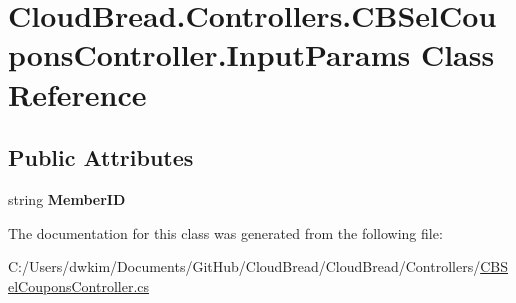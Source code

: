 \hypertarget{class_cloud_bread_1_1_controllers_1_1_c_b_sel_coupons_controller_1_1_input_params}{}\section{Cloud\+Bread.\+Controllers.\+C\+B\+Sel\+Coupons\+Controller.\+Input\+Params Class Reference}
\label{class_cloud_bread_1_1_controllers_1_1_c_b_sel_coupons_controller_1_1_input_params}
\subsection*{Public Attributes}
\begin{DoxyCompactItemize}
\item 
string {\bfseries Member\+ID}\hypertarget{class_cloud_bread_1_1_controllers_1_1_c_b_sel_coupons_controller_1_1_input_params_a6c7de5af57832a0355d7a5401e05e886}{}\label{class_cloud_bread_1_1_controllers_1_1_c_b_sel_coupons_controller_1_1_input_params_a6c7de5af57832a0355d7a5401e05e886}

\end{DoxyCompactItemize}


The documentation for this class was generated from the following file\+:\begin{DoxyCompactItemize}
\item 
C\+:/\+Users/dwkim/\+Documents/\+Git\+Hub/\+Cloud\+Bread/\+Cloud\+Bread/\+Controllers/\hyperlink{_c_b_sel_coupons_controller_8cs}{C\+B\+Sel\+Coupons\+Controller.\+cs}\end{DoxyCompactItemize}
